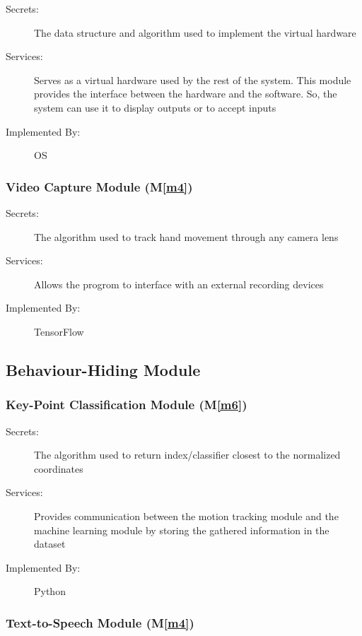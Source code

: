 \documentclass[12pt, titlepage]{article}
\newcommand{\mref}[1]{M\ref{#1}}
\begin{document}
\begin{description}
  \item[Secrets:] The data structure and algorithm used to implement the virtual hardware
  \item[Services:] Serves as a virtual hardware used by the rest of the system. This module provides the interface between the hardware and the software. So, the system can use it to display outputs or to accept inputs
  \item[Implemented By:] OS
  \end{description}
  
\subsubsection{Video Capture Module (\mref{m4})}

\begin{description}
  \item[Secrets:] The algorithm used to track hand movement through any camera lens
  \item[Services:] Allows the progrom to interface with an external recording devices
  \item[Implemented By:] TensorFlow
  \end{description}

\subsection{Behaviour-Hiding Module}

\subsubsection{Key-Point Classification Module (\mref{m6})}

\begin{description}
  \item[Secrets:] The algorithm used to return index/classifier closest to the normalized coordinates
  \item[Services:] Provides communication between the motion tracking module and the machine learning module by storing the gathered information in the dataset
  \item[Implemented By:] Python
  \end{description}

\subsubsection{Text-to-Speech Module (\mref{m4})}
\end{document}
